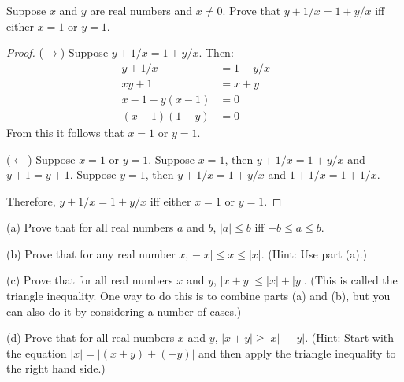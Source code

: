 \begin{tcolorbox}[title=Problem 10, breakable]
    Suppose $x$ and $y$ are real numbers and $x \not = 0$. Prove that $y + 1/x  = 1 + y/x$ iff
    either $x = 1$ or $y = 1$.
\end{tcolorbox}

\begin{proof}
    ($\rightarrow$) Suppose $y + 1/x  = 1 + y/x$.
    Then:
    \begin{align*}
        y + 1/x          & = 1 + y/x &  & \\
        xy + 1           & = x + y   &  & \\
        x - 1 - y(x - 1) & = 0       &  & \\
        (x - 1)(1 - y)   & = 0 
    \end{align*}
    From this it follows that $x = 1$ or $y = 1$.

    ($\leftarrow$) Suppose $x = 1$ or $y = 1$.
    Suppose $x = 1$, then $y + 1/x = 1 + y/x$ and $y + 1 = y + 1$.
    Suppose $y = 1$, then $y + 1/x = 1 + y/x$ and $1 + 1/x = 1 + 1/x$.

    Therefore, $y + 1/x = 1 + y/x$ iff either $x = 1$ or $y = 1$.
\end{proof}

\begin{tcolorbox}[title=Problem 13, breakable]
    (a) Prove that for all real numbers $a$ and $b$, $|a| \le b$ iff $-b \le a \le b$.

    (b) Prove that for any real number $x$, $-|x| \le x \le |x|$. (Hint: Use part (a).)

    (c) Prove that for all real numbers $x$ and $y$, $|x + y| \le |x| + |y|$. (This
    is called the triangle inequality. One way to do this is to combine parts (a)
    and (b), but you can also do it by considering a number of cases.)

    (d) Prove that for all real numbers $x$ and $y$, $|x + y| \ge |x| - |y|$. (Hint:
    Start with the equation $|x| = |(x + y) + (-y)|$ and then apply the 
    triangle inequality to the right hand side.)
\end{tcolorbox}


